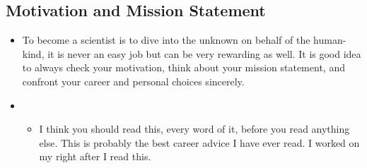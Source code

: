 \documentclass[letterpaper,10pt,english]{sphinxmanual}
\begin{document}
\subsection{Motivation and Mission Statement}
\label{\detokenize{resource/research/getting_started:motivation-and-mission-statement}}\begin{itemize}
\item {} 
To become a scientist is to dive into the unknown on behalf of the
human-kind, it is never an easy job but can be very rewarding as
well. It is good idea to always check your motivation, think about
your mission statement, and confront your career and personal choices
sincerely.

\item {} 
\begin{itemize}
\item {} 
I think you should read this, every word of it, before you read
anything else. This is probably the best career advice I have ever
read. I worked on my  right after I read
this.

\end{itemize}

\end{itemize}
\end{document}
